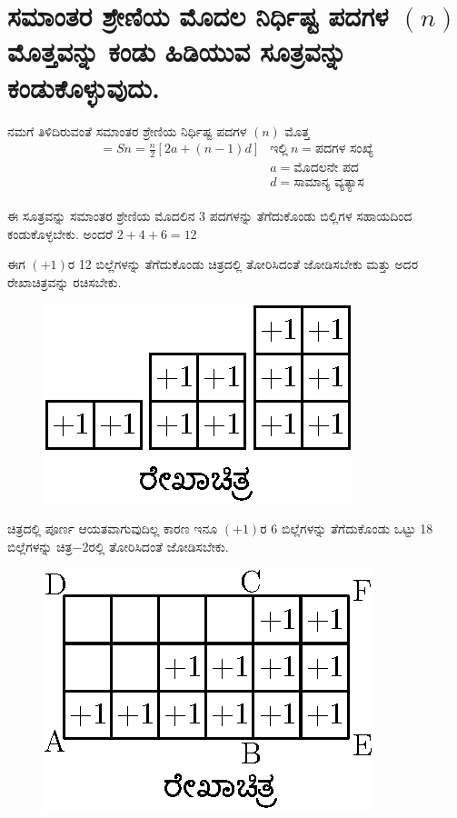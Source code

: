 \section{ಸಮಾಂತರ ಶ್ರೇಣಿಯ ಮೊದಲ ನಿರ್ಧಿಷ್ಟ ಪದಗಳ $(n)$ ಮೊತ್ತವನ್ನು ಕಂಡು ಹಿಡಿಯುವ ಸೂತ್ರವನ್ನು ಕಂಡುಕೊಳ್ಳುವುದು.}\label{sec3.11}%

ನಮಗೆ ತಿಳಿದಿರುವಂತೆ ಸಮಾಂತರ ಶ್ರೇಣಿಯ ನಿರ್ಧಿಷ್ಟ ಪದಗಳ $(n)$ ಮೊತ್ತ 
\begin{align*}
= Sn = \frac{n}{2} [2a + (n-1) d] & \text{ಇಲ್ಲಿ}~ n = \text{ಪದಗಳ ಸಂಖ್ಯೆ}\\
& a = \text{ಮೊದಲನೇ ಪದ}\\
& d = \text{ಸಾಮಾನ್ಯ ವ್ಯತ್ಯಾಸ}
\end{align*}

ಈ ಸೂತ್ರವನ್ನು ಸಮಾಂತರ ಶ್ರೇಣಿಯ ಮೊದಲಿನ 3 ಪದಗಳನ್ನು ತೆಗೆದುಕೊಂಡು ಬಿಲ್ಲಿಗಳ ಸಹಾಯದಿಂದ ಕಂಡುಕೊಳ್ಳಬೇಕು. ಅಂದರೆ $2 + 4 + 6 = 12$

\smallskip

ಈಗ $(+1)$ರ 12 ಬಿಲ್ಲೆಗಳನ್ನು ತೆಗೆದುಕೊಂಡು ಚಿತ್ರದಲ್ಲಿ ತೋರಿಸಿದಂತೆ ಜೋಡಿಸ\-ಬೇಕು ಮತ್ತು ಅದರ ರೇಖಾಚಿತ್ರವನ್ನು ರಚಿಸಬೇಕು.
\begin{figure}[H]
\centering
\includegraphics{src/figure/chap3/fig3-56a.eps}
\end{figure}

ಚಿತ್ರದಲ್ಲಿ ಪೂರ್ಣ ಆಯತವಾಗುವುದಿಲ್ಲ ಕಾರಣ ಇನೂ $(+1)$ರ 6 ಬಿಲ್ಲೆಗಳನ್ನು ತೆಗೆದುಕೊಂಡು ಒಟ್ಟು 18 ಬಿಲ್ಲೆಗಳನ್ನು ಚಿತ್ರ$-$2ರಲ್ಲಿ ತೋರಿಸಿದಂತೆ ಜೋಡಿಸಬೇಕು. 
\begin{figure}[H]
\centering
\includegraphics{src/figure/chap3/fig3-56b.eps}
\end{figure}

